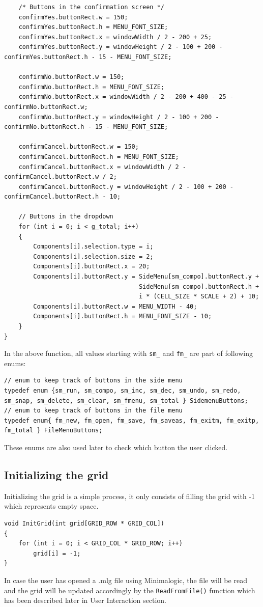 \documentclass[report]{subfiles}
\begin{document}
\begin{lstlisting}
    /* Buttons in the confirmation screen */
    confirmYes.buttonRect.w = 150;
    confirmYes.buttonRect.h = MENU_FONT_SIZE;
    confirmYes.buttonRect.x = windowWidth / 2 - 200 + 25;
    confirmYes.buttonRect.y = windowHeight / 2 - 100 + 200 - confirmYes.buttonRect.h - 15 - MENU_FONT_SIZE;

    confirmNo.buttonRect.w = 150;
    confirmNo.buttonRect.h = MENU_FONT_SIZE;
    confirmNo.buttonRect.x = windowWidth / 2 - 200 + 400 - 25 - confirmNo.buttonRect.w;
    confirmNo.buttonRect.y = windowHeight / 2 - 100 + 200 - confirmNo.buttonRect.h - 15 - MENU_FONT_SIZE;

    confirmCancel.buttonRect.w = 150;
    confirmCancel.buttonRect.h = MENU_FONT_SIZE;
    confirmCancel.buttonRect.x = windowWidth / 2 - confirmCancel.buttonRect.w / 2;
    confirmCancel.buttonRect.y = windowHeight / 2 - 100 + 200 - confirmCancel.buttonRect.h - 10;

    // Buttons in the dropdown
    for (int i = 0; i < g_total; i++)
    {
        Components[i].selection.type = i;
        Components[i].selection.size = 2;
        Components[i].buttonRect.x = 20;
        Components[i].buttonRect.y = SideMenu[sm_compo].buttonRect.y +
                                     SideMenu[sm_compo].buttonRect.h +
                                     i * (CELL_SIZE * SCALE + 2) + 10;
        Components[i].buttonRect.w = MENU_WIDTH - 40;
        Components[i].buttonRect.h = MENU_FONT_SIZE - 10;
    }
}
    \end{lstlisting}
    In the above function, all values starting with \texttt{sm\_} and \texttt{fm\_} are part of following enums:
    \begin{lstlisting}
// enum to keep track of buttons in the side menu
typedef enum {sm_run, sm_compo, sm_inc, sm_dec, sm_undo, sm_redo, sm_snap, sm_delete, sm_clear, sm_fmenu, sm_total } SidemenuButtons;
// enum to keep track of buttons in the file menu
typedef enum{ fm_new, fm_open, fm_save, fm_saveas, fm_exitm, fm_exitp, fm_total } FileMenuButtons;
    \end{lstlisting}
    These enums are also used later to check which button the user clicked.
    \subsection{Initializing the grid}
    Initializing the grid is a simple process, it only consists of filling the grid with -1 which represents empty space.
    \begin{lstlisting}
void InitGrid(int grid[GRID_ROW * GRID_COL])
{
    for (int i = 0; i < GRID_COL * GRID_ROW; i++)
        grid[i] = -1;
}
    \end{lstlisting}
    In case the user has opened a .mlg file using Minimalogic, the file will be read and the grid will be updated accordingly by the \texttt{ReadFromFile()} function which has been described later in User Interaction section.
\end{document}
